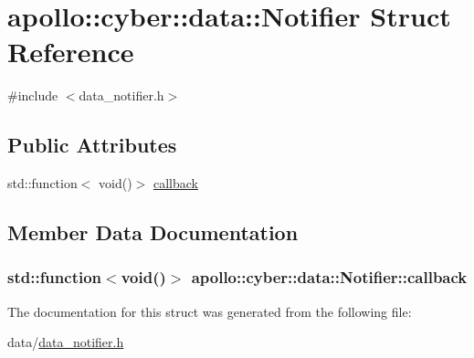 \hypertarget{structapollo_1_1cyber_1_1data_1_1Notifier}{\section{apollo\-:\-:cyber\-:\-:data\-:\-:Notifier Struct Reference}
\label{structapollo_1_1cyber_1_1data_1_1Notifier}
}


{\ttfamily \#include $<$data\-\_\-notifier.\-h$>$}

\subsection*{Public Attributes}
\begin{DoxyCompactItemize}
\item 
std\-::function$<$ void()$>$ \hyperlink{structapollo_1_1cyber_1_1data_1_1Notifier_aeb5a3a415e795cf559c375b239e7aeda}{callback}
\end{DoxyCompactItemize}


\subsection{Member Data Documentation}
\hypertarget{structapollo_1_1cyber_1_1data_1_1Notifier_aeb5a3a415e795cf559c375b239e7aeda}{
\subsubsection[{callback}]{\setlength{\rightskip}{0pt plus 5cm}std\-::function$<$void()$>$ apollo\-::cyber\-::data\-::\-Notifier\-::callback}}\label{structapollo_1_1cyber_1_1data_1_1Notifier_aeb5a3a415e795cf559c375b239e7aeda}


The documentation for this struct was generated from the following file\-:\begin{DoxyCompactItemize}
\item 
data/\hyperlink{data__notifier_8h}{data\-\_\-notifier.\-h}\end{DoxyCompactItemize}
